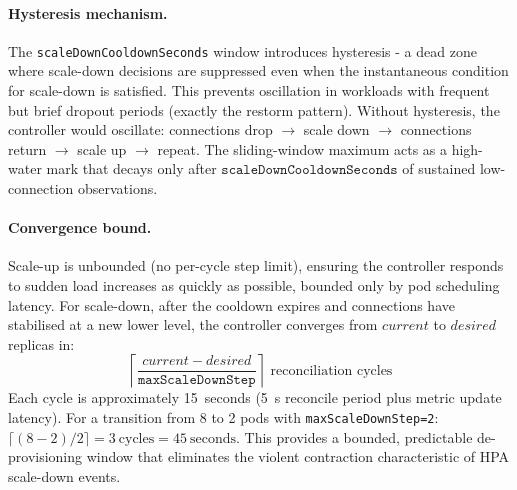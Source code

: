 \documentclass[twocolumn]{svjour3}
\begin{document}
\paragraph{Hysteresis mechanism.}
The \texttt{scaleDownCooldownSeconds} window introduces hysteresis - a dead zone where scale-down decisions are suppressed even when the instantaneous condition for scale-down is satisfied. This prevents oscillation in workloads with frequent but brief dropout periods (exactly the restorm pattern). Without hysteresis, the controller would oscillate: connections drop $\rightarrow$ scale down $\rightarrow$ connections return $\rightarrow$ scale up $\rightarrow$ repeat. The sliding-window maximum acts as a high-water mark that decays only after $\texttt{scaleDownCooldownSeconds}$ of sustained low-connection observations.

\paragraph{Convergence bound.}
Scale-up is unbounded (no per-cycle step limit), ensuring the controller responds to sudden load increases as quickly as possible, bounded only by pod scheduling latency. For scale-down, after the cooldown expires and connections have stabilised at a new lower level, the controller converges from $current$ to $desired$ replicas in:
\begin{equation}
\left\lceil \frac{current - desired}{\texttt{maxScaleDownStep}} \right\rceil \text{ reconciliation cycles}
\label{eq:convergence}
\end{equation}
Each cycle is approximately 15~seconds (5~s reconcile period plus metric update latency). For a transition from 8 to 2 pods with \texttt{maxScaleDownStep=2}: $\lceil (8-2)/2 \rceil = 3\ \text{cycles} = 45\ \text{seconds}$. This provides a bounded, predictable de-provisioning window that eliminates the violent contraction characteristic of HPA scale-down events.
\end{document}

